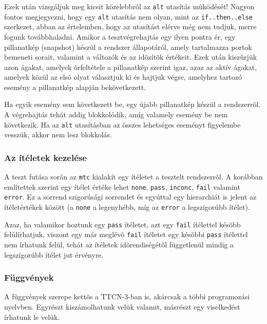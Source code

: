 \documentclass[a4paper]{article}
\begin{document}
Ezek után vizsgáljuk meg kicsit közelebbrõl az \verb/alt/ utasítás mûködését! Nagyon fontos
megjegyezni, hogy egy \verb/alt/ utasítás nem olyan, mint az \verb/if..then..else/ szerkezet, abban
az értelemben, hogy az utasítást elérve még nem tudjuk, merre fogunk továbbhaladni. Amikor
a tesztvégrehajtás egy ilyen pontra ér, egy pillanatkép (snapshot) készül a rendszer állapotáról,
amely tartalmazza portok bemeneti sorait, valamint a változók és az idõzítõk értékeit. Ezek után kiszûrjük
azon ágakat, amelyek õrfeltétele a pillanatkép szerint igaz, azaz az aktív ágakat, amelyek közül
az elsõ olyat választjuk ki és hajtjuk végre, amelyhez tartozó esemény a pillanatkép alapján bekövetkezett.

Ha egyik esemény sem
következett be, egy újabb pillanatkép készül a rendszerrõl. A végrehajtás tehát addig
blokkolódik, amíg valamely esemény be nem következik. Ha az \verb!alt!
utasításban az összes lehetséges eseményt figyelembe vesszük, akkor
nem lesz blokkolás.


\subsubsection{Az ítéletek kezelése}
A teszt futása során az \verb!mtc! kialakít egy ítéletet a tesztelt rendszerrõl. A
korábban említettek szerint egy ítélet értéke lehet \verb/none/, \verb/pass/, \verb/inconc/, \verb/fail/ valamint
\verb/error/. Ez a sorrend szigorúsági sorrendet és egyúttal egy hierarchiát is jelent az ítéletértékek
között (a \verb/none/ a legenyhébb, míg az \verb/error/ a legszigorúbb
ítélet). 

Azaz, ha valamikor hoztunk egy \verb/pass/ ítéletet, %
azt egy \verb/fail/ ítélettel késõbb felülírhatjuk, viszont egy már meglévõ \verb/fail/ ítéletet egy
késõbbi \verb/pass/ ítélettel nem írhatunk felül, tehát az 
ítéletek idõrendiségétõl függetlenül mindig a legszigorúbb ítélet jut érvényre.


\subsubsection{Függvények}
A függvények szerepe kettõs a TTCN-3-ban is, akárcsak a többi programozási nyelvben.
Egyrészt kiszámolhatunk velük valamit, másrészt egy viselkedést írhatunk le velük.
\end{document}
